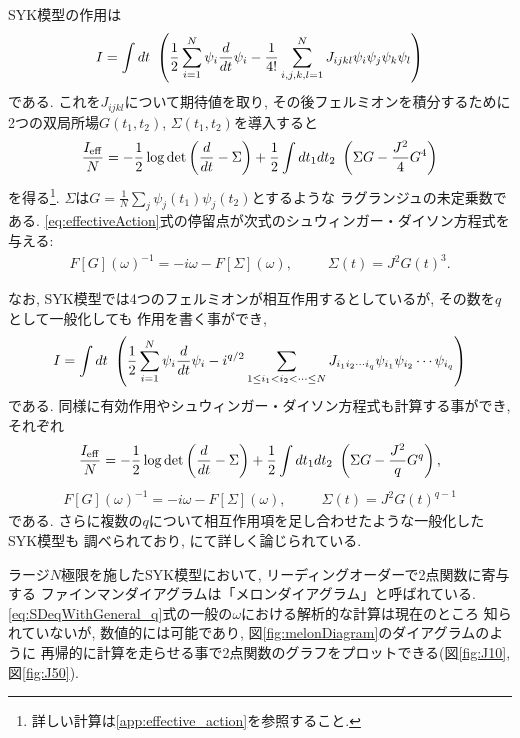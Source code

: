 SYK模型の作用は
\begin{align}
  I = \int dt\ \left(\frac{1}{2}\sum_{i = 1}^{N} \psi_i \frac{d}{dt} \psi_i
		- \frac{1}{4!} \sum_{i,j,k,l = 1}^{N} J_{ijkl} \psi_i\psi_j\psi_k\psi_l
    \right)
\end{align}
である. 
これを$J_{ijkl}$について期待値を取り, その後フェルミオンを積分するために
2つの双局所場$G(t_1, t_2)$, $\Sigma(t_1, t_2)$を導入すると
\begin{align}
  \frac{I_{\mathrm{eff}}}{N} =
		- \frac{1}{2}\log\det\left(\frac{d}{dt} - \Sigma\right)
		+ \frac{1}{2}\int dt_1dt_2\ \left(\Sigma G - \frac{J^2}{4}G^4\right)
  \label{eq:effectiveAction}
\end{align}
を得る\footnote{詳しい計算は\ref{app:effective_action}を参照すること.}. 
$\Sigma$は$G = \frac{1}{N}\sum_j \psi_j(t_1)\psi_j(t_2)$とするような
ラグランジュの未定乗数である. 
\eqref{eq:effectiveAction}式の停留点が次式のシュウィンガー・ダイソン方程式を与える:
\begin{align}
  F[G](\omega)^{-1} = -i\omega - F[\Sigma](\omega),
  \hspace{30pt}
  \Sigma(t) = J^2G(t)^3.
  \label{eq:SDeq}
\end{align}

なお, SYK模型では4つのフェルミオンが相互作用するとしているが, その数を$q$として一般化しても
作用を書く事ができ,
\begin{align}
	I = \int dt\ \left(
		\frac{1}{2}\sum_{i = 1}^N \psi_i\frac{d}{dt} \psi_i	
		- i^{q/2}\sum_{1\leq i_1 < i_2 < \cdots \leq N}J_{i_1i_2\cdots i_q}\psi_{i_1}\psi_{i_2}\cdots\psi_{i_q}
	\right)
\end{align}
である.
同様に有効作用やシュウィンガー・ダイソン方程式も計算する事ができ, それぞれ
\begin{align}
  \frac{I_{\mathrm{eff}}}{N} =
		- \frac{1}{2}\log\det\left(\frac{d}{dt} - \Sigma\right)
		+ \frac{1}{2}\int dt_1dt_2\ \left(\Sigma G - \frac{J^2}{q}G^q\right),
  \label{eq:effectiveActionWithGeneral_q}
\end{align}
\begin{align}
  F[G](\omega)^{-1} = -i\omega - F[\Sigma](\omega),
  \hspace{30pt}
  \Sigma(t) = J^2G(t)^{q-1}
  \label{eq:SDeqWithGeneral_q}
\end{align}
である. さらに複数の$q$について相互作用項を足し合わせたような一般化したSYK模型も
調べられており, \cite{gross}にて詳しく論じられている. 

ラージ$N$極限を施したSYK模型において, リーディングオーダーで2点関数に寄与する
ファインマンダイアグラムは「メロンダイアグラム」と呼ばれている. 
\eqref{eq:SDeqWithGeneral_q}式の一般の$\omega$における解析的な計算は現在のところ
知られていないが, 数値的には可能であり, 図\ref{fig:melonDiagram}のダイアグラムのように
再帰的に計算を走らせる事で2点関数のグラフをプロットできる(図\ref{fig:J10}, 図\ref{fig:J50}). 

